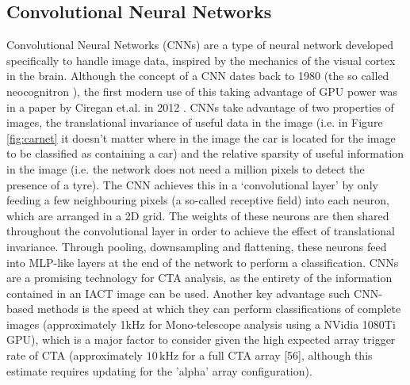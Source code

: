 \subsection{Convolutional Neural Networks}
Convolutional Neural Networks (CNNs) are a type of neural network developed specifically to handle image data, inspired by the mechanics of the visual cortex in the brain. Although the concept of a CNN dates back to 1980 (the so called neocognitron \cite{neocongnitron}), the first modern use of this taking advantage of GPU power was in a paper by Ciregan et.al. in 2012 \cite{ciregan}. CNNs take advantage of two properties of images, the translational invariance of useful data in the image (i.e. in Figure \ref{fig:carnet} it doesn't matter where in the image the car is located for the image to be classified as containing a car) and the relative sparsity of useful information in the image (i.e. the network does not need a million pixels to detect the presence of a tyre). The CNN achieves this in a `convolutional layer' by only feeding a few neighbouring pixels (a so-called receptive field) into each neuron, which are arranged in a 2D grid. The weights of these neurons are then shared throughout the convolutional layer in order to achieve the effect of translational invariance. Through pooling, downsampling and flattening, 
these neurons feed into MLP-like layers at the end of the network to perform a classification. CNNs are a promising technology for CTA analysis, as the entirety of the information contained in an IACT image can be used.  Another key advantage such CNN-based methods is the speed at which they can perform classifications of complete images (approximately 1kHz for Mono-telescope analysis using a NVidia 1080Ti GPU), which is a major factor to consider given the high expected array trigger rate of CTA (approximately $\mathrm{10\,kHz}$ for a full CTA array [56], although this estimate requires updating for the 'alpha' array configuration).

